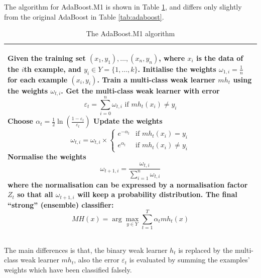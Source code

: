 The algorithm for AdaBoost.M1 is shown in \mbox{Table} \ref{tab:adaboostm1}, and differs only slightly from the original AdaBoost in \mbox{Table} \ref{tab:adaboost}.
\begin{table}
\caption{The AdaBoost.M1 algorithm}
\begin{tabular}{p{\columnwidth}}
\hline
\begin{algorithmic}[1]
\STATE Given the training set $(x_{1},y_{1}),\ldots,(x_{n},y_{n})$, where $x_{i}$ is the data of the $i$th example, and $y_{i} \in Y=\{1,\ldots,k\}$.
\STATE Initialise the weights $\omega_{1,i}=\frac{1}{n}$ for each example $(x_{i},y_{i})$.
\FOR{$t=1,\ldots,T$}
	\STATE Train a multi-class weak learner $mh_{t}$ using the weights $\omega_{t,i}$.
	\STATE Get the multi-class weak learner with error 
                       \begin{equation}
                        \varepsilon_{t} =\sum_{i=0}^{n}\omega_{t,i}  \textrm{ if $mh_{t}(x_{i}) \ne y_{i}$}
                       \end{equation}
	\STATE Choose $\alpha_{t}=\frac{1}{2}\ln \left( \frac{1-\varepsilon_{t}}{\varepsilon_{t}} \right)$
	\STATE Update the weights 
		\begin{equation}
		 \omega_{t,i} = \omega_{t,i} \times
                 \left\{
		  \begin{array}{ll}
		                                            e^{-\alpha_{t}} & \textrm{if $mh_{t}(x_{i})=y_{i}$} \\
						           e^{\alpha_{t}} & \textrm{if $mh_{t}(x_{i}) \neq y_{i}$}
		  \end{array}
		\right.
		\end{equation}
	\STATE Normalise the weights 
		\begin{equation}
		  \omega_{t+1,i} = \frac{\omega_{t,i}}{\sum_{i=1}^{n}\omega_{t,i}}
		\end{equation}
	where the normalisation can be expressed by a normalisation factor $Z_{t}$ so that all $ \omega_{t+1,i}$ will keep a probability distribution.
\ENDFOR
\STATE The final ``strong'' (ensemble) classifier:
	\begin{equation}
	 MH(x)  = \arg\max_{y\in Y} \sum_{t=1}^{T} \alpha_{t} mh_{t}(x)
	\end{equation}
\end{algorithmic}\\
\hline
\end{tabular}
\label{tab:adaboostm1}
\end{table} 
The main differences is that, the binary weak learner $h_{t}$ is replaced by the multi-class weak learner $mh_{t}$, also the error $\varepsilon_{t}$ is evaluated by summing the examples' weights which have been classified falsely.

